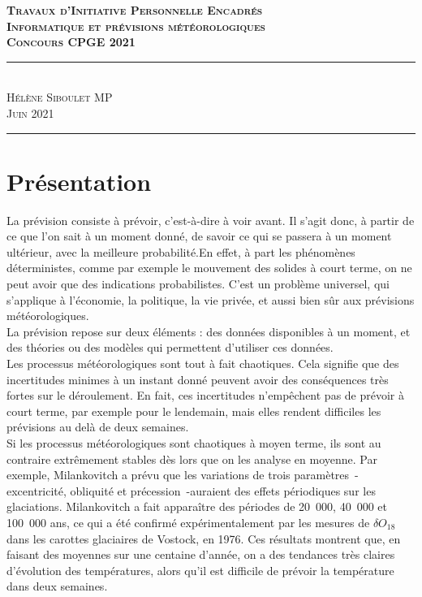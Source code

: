 \documentclass[11pt,a4paper]{article}
\begin{document}
\begin{flushleft}
\Large \textcolor{BrickRed}{\textsc{\textbf{Travaux d'Initiative Personnelle Encadrés}}} \\
\Huge \textcolor{BrickRed}{\textsc{\textbf{Informatique et prévisions météorologiques }}} \\[0.5cm]
\Large \textcolor{BrickRed}{\textsc{\textbf{Concours CPGE 2021 \\[0.5 cm]}}}
\hrule \textcolor{White}{-} \\[0.1cm]
\Large \textsc{Hélène Siboulet MP} \\
\Large \textsc{Juin 2021} \\[0.5cm]
\hrule
\end{flushleft}
\section{Présentation} 
La prévision consiste à prévoir, c'est-à-dire à \og voir avant\fg{}. Il s'agit donc, à partir de ce que l'on sait à un moment donné, de savoir ce qui se passera à un moment ultérieur, avec la meilleure probabilité.En effet, à part les phénomènes déterministes, comme par exemple le mouvement des solides à court terme, on ne peut avoir que des indications probabilistes. C'est un problème universel, qui s'applique à l'économie, la politique, la vie privée, et aussi bien sûr aux prévisions météorologiques.   \\
La prévision repose sur deux éléments : des données disponibles à un moment, et des théories ou des modèles qui permettent d'utiliser ces données. \\
Les processus météorologiques sont tout à fait chaotiques. Cela signifie que des incertitudes minimes à un instant donné peuvent avoir des conséquences très fortes sur le déroulement. En fait, ces incertitudes n'empêchent pas de prévoir à court terme, par exemple pour le lendemain, mais elles rendent difficiles les prévisions au delà de deux semaines. \\
Si les processus météorologiques sont chaotiques à moyen terme, ils sont au contraire extrêmement stables dès lors que on les analyse en moyenne. Par exemple, Milankovitch a prévu que les variations de trois paramètres~-excentricité, obliquité et précession~-auraient des effets périodiques sur les glaciations. Milankovitch a fait apparaître des périodes de 20~000, 40~000 et 100~000 ans, ce qui a été confirmé expérimentalement par les mesures de $\delta O_{18}$ dans les carottes glaciaires de Vostock, en 1976. Ces résultats montrent que, en faisant des moyennes sur une centaine d'année, on a des tendances très claires d'évolution des températures, alors qu'il est difficile de prévoir la température dans deux semaines.   
 
\end{document}
